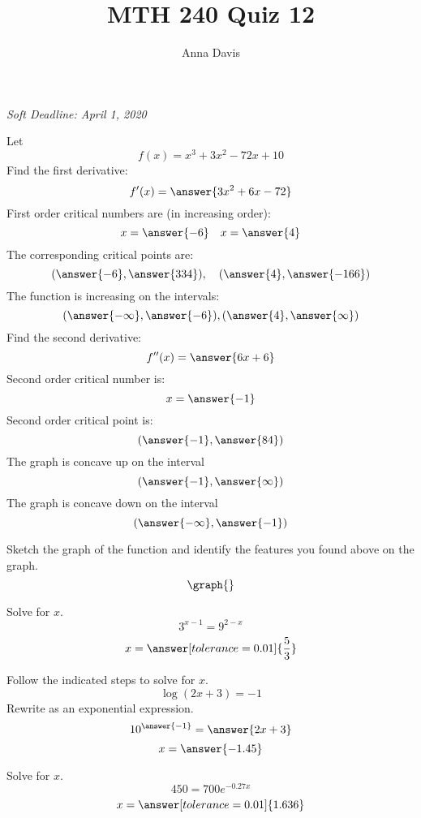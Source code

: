 \documentclass{ximera}
\author{Anna Davis} \title{MTH 240 Quiz 12}
\begin{document}
\begin{abstract}

\end{abstract}
\maketitle
 \textit{Soft Deadline: April 1, 2020}
\begin{problem}\label{prob:240quiz12prob1}
Let $$f(x)=x^3+3x^2-72x+10$$
Find the first derivative:
$$f'(x)=\answer{3x^2+6x-72}$$
First order critical numbers are (in increasing order):
$$x=\answer{-6}\quad x=\answer{4}$$
The corresponding critical points are:
$$(\answer{-6}, \answer{334}),\quad (\answer{4}, \answer{-166})$$
The function is increasing on the intervals:
$$(\answer{-\infty},\answer{-6}), (\answer{4}, \answer{\infty})$$
Find the second derivative:
$$f''(x)=\answer{6x+6}$$
Second order critical number is:
$$x=\answer{-1}$$
Second order critical point is:
$$(\answer{-1}, \answer{84})$$
The graph is concave up on the interval
$$(\answer{-1}, \answer{\infty})$$
The graph is concave down on the interval
$$(\answer{-\infty}, \answer{-1})$$

Sketch the graph of the function and identify the features you found above on the graph.
\[
\graph{}
\]


\end{problem}

\begin{problem}\label{prob:240quiz12prob2}
Solve for $x$.
$$3^{x-1}=9^{2-x}$$
$$x=\answer[tolerance=0.01]{\frac{5}{3}}$$
\end{problem}

\begin{problem}\label{prob:240quiz12prob3}
Follow the indicated steps to solve for $x$.
$$\log (2x+3)=-1$$
Rewrite as an exponential expression.
$$10^{\answer{-1}}=\answer{2x+3}$$
$$x=\answer{-1.45}$$
\end{problem}

\begin{problem}\label{prob:240quiz12prob4}
Solve for $x$.
$$450=700e^{-0.27x}$$
$$x=\answer[tolerance=0.01]{1.636}$$
\end{problem}
\end{document}
